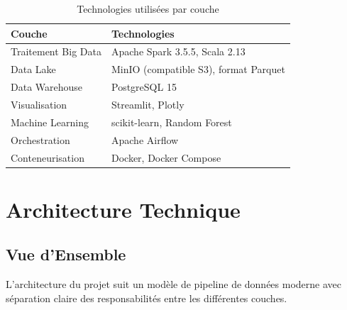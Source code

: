 \documentclass[12pt,a4paper]{report}
\begin{document}
\begin{table}[H]
\centering
\caption{Technologies utilisées par couche}
\begin{tabular}{@{}ll@{}}
\toprule
\textbf{Couche} & \textbf{Technologies} \\
\midrule
Traitement Big Data & Apache Spark 3.5.5, Scala 2.13 \\
Data Lake & MinIO (compatible S3), format Parquet \\
Data Warehouse & PostgreSQL 15 \\
Visualisation & Streamlit, Plotly \\
Machine Learning & scikit-learn, Random Forest \\
Orchestration & Apache Airflow \\
Conteneurisation & Docker, Docker Compose \\
\bottomrule
\end{tabular}
\end{table}

\chapter{Architecture Technique}

\section{Vue d'Ensemble}

L'architecture du projet suit un modèle de pipeline de données moderne avec séparation claire des responsabilités entre les différentes couches.
\end{document}
